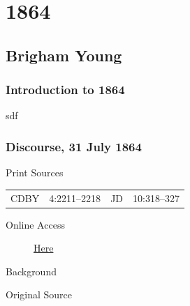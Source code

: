 \section{1864}

	\subsection{Brigham Young}
		\label{EMS-1864-BY}

		\subsubsection{Introduction to 1864}
		
			sdf
			
		\subsubsection{Discourse, 31 July 1864}
			\label{EMS-1864-BY-31-JUL-1864}
			
			\begin{description}
					\item[Print Sources]
				\end{description}

					\begin{tabular}{p{0.5in}p{1in}p{0.5in}p{1in}}
					CDBY	& 4:2211--2218		& JD 		& 10:318--327 \\
					\end{tabular}
				
				\begin{description}
					\item[Online Access] \href{https://drive.google.com/file/d/1bfdBkrQaFzyVpdWGI_um2Gfm8AYGat3p/view?usp=sharing}{Here}
				\end{description}
				
				\begin{description}
					\item[Background]
				\end{description}
				
					\phantom{.}
				
				\begin{description}
					\item[Original Source]
				\end{description}
				
